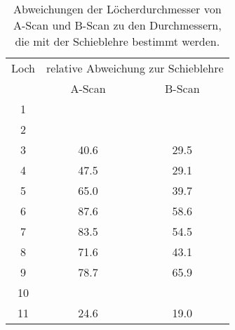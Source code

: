 \begin{table}
  \centering
  \begin{tabular}{c|cc}
    \toprule
    \multicolumn{1}{c|}{Loch} & \multicolumn{2}{c}{relative Abweichung zur Schieblehre}\\
    & {A-Scan} & {B-Scan} \\
  \midrule
  1  &  \hrulefill  & \hrulefill  \\
  2  &  \hrulefill  & \hrulefill  \\
  3  &  40.6        & 29.5  \\
  4  &  47.5        & 29.1  \\
  5  &  65.0        & 39.7  \\
  6  &  87.6        & 58.6  \\
  7  &  83.5        & 54.5  \\
  8  &  71.6        & 43.1  \\
  9  &  78.7        & 65.9  \\
  10 &  \hrulefill  & \hrulefill  \\
  11 &  24.6        & 19.0  \\
  \bottomrule
  \end{tabular}
  \caption{Abweichungen der Löcherdurchmesser von A-Scan und B-Scan zu den Durchmessern, die mit der Schieblehre bestimmt werden.}
  \label{tab:abweichung}
\end{table}
